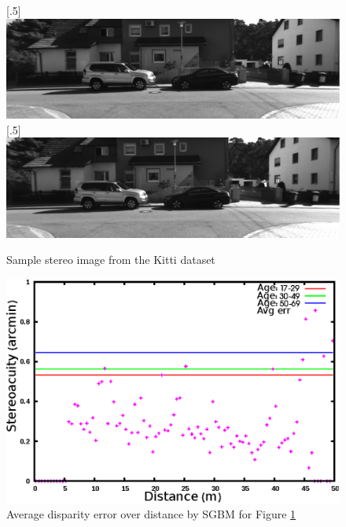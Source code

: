 \begin{figure}[H]
\centering
{}
[.5\linewidth]{\includegraphics[scale=0.21]{000005L}}%
[.5\linewidth]{\includegraphics[scale=0.21]{000005R}}%
\caption{Sample stereo image from the Kitti dataset}
\label{fig:img5}
\end{figure}
\begin{figure}[H]
\centering
\includegraphics[scale=0.95]{sgbmimg5pix3msk}
\caption{Average disparity error over distance by SGBM for Figure \protect\ref{fig:img5}}
\label{fig:imgmsk5}
\end{figure} 
